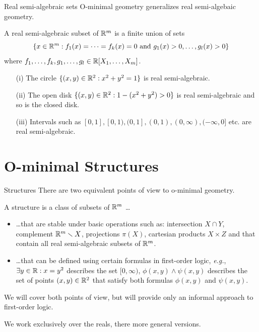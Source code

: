 \documentclass{beamer}
\begin{document}
\begin{frame}{Real semi-algebraic sets} 
  O-minimal geometry generalizes real semi-algebaic geometry. 

  \begin{definition}
    A \alert{real semi-algebraic} subset of ${\mathbb{R}}^m$ is a finite union
    of sets    
    \begin{equation*}
      \{x\in{\mathbb{R}}^m :f_1(x) =\cdots = f_k(x) = 0 \text{ and }
      g_1(x)>0,\ldots,g_l(x)>0\}
    \end{equation*}
    where $f_1,\ldots,f_k,g_1,\ldots,g_l\in {\mathbb{R}}[X_1,\ldots,X_m]$.
  \end{definition}

  \begin{example}
    \begin{enumerate}
    \item [(i)] The circle $\{(x,y)\in{\mathbb{R}}^2: x^2+y^2=1\}$ is
      real semi-algebraic.
    \item[(ii)] The open disk $\{(x,y) \in{\mathbb{R}}^2 : 1-(x^2+y^2)>0\}$ is
      real semi-algebraic and so is the closed disk.
    \item[(iii)] Intervals such as
      $[0,1],[0,1),(0,1],(0,1),(0,\infty),(-\infty,0]$ etc. are real
      semi-algebraic. 
    \end{enumerate}
  \end{example}
\end{frame}

\section{O-minimal Structures}

\begin{frame}{Structures}
  There are two equivalent
  points of view to o-minimal geometry.

  A \alert{structure} is a class of
    subsets of ${\mathbb{R}}^m$ \ldots
  \begin{itemize}
  \item \ldots  that are stable under basic operations
    such as: \alert{intersection} $X\cap Y$, \alert{complement}
    ${\mathbb{R}}^m\smallsetminus X$,
    \alert{projections} $\pi(X)$, \alert{cartesian products} $X\times
    Z$ and that contain all real semi-algebraic subsets of ${\mathbb{R}}^m$.

  \item \ldots that can be defined using certain formulas in
    first-order
    logic, \textit{e.g.}, 
    $\exists y\in {\mathbb{R}} : x=y^2$ describes the set $[0,\infty)$,
    $\phi(x,y)\wedge \psi(x,y)$ describes the set of points
    $(x,y)\in{\mathbb{R}}^2$ that satisfy both formulas $\phi(x,y)$ and
    $\psi(x,y)$. 
  \end{itemize}
  We will cover both points of view, but will provide only an informal
  approach to first-order logic.
  
  We work exclusively
  over the reals,  there more general versions.
\end{frame}
\end{document}
